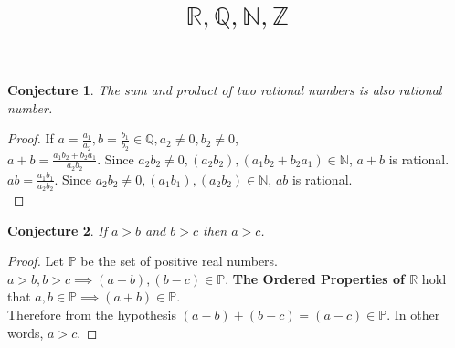 \documentclass{article}
\title{$\mathbb{R}, \mathbb{Q}, \mathbb{N}, \mathbb{Z}$}
\newtheorem*{conjecture}{Conjecture}
\newtheorem*{corollary}{Corollary}
\begin{document}
\maketitle

\begin{conjecture}The sum and product of two rational numbers
is also  rational number.
\end{conjecture}
\begin{proof}If $a=\frac{a_1}{a_2}, b=\frac{b_1}{b_2} \in \mathbb{Q},
    a_2 \ne{0}, b_2 \ne{0}$,\\
    
    $a+b=\frac{a_1b_2+b_2a_1}{a_2b_2}$. Since $a_2b_2 \ne{0}, (a_2b_2), (a_1b_2+b_2a_1) \in \mathbb{N}$,
    $a+b$ is rational.\\

    $ab=\frac{a_1b_1}{a_2b_2}$. Since $a_2b_2 \ne{0}, (a_1b_1), (a_2b_2) \in \mathbb{N}$,
    $ab$ is rational.\\
\end{proof}
\begin{conjecture}If $a>b$ and $b>c$ then $a>c$.
\end{conjecture}
\begin{proof}Let $\mathbb{P}$ be the set of positive real numbers.
    $a>b,b>c \implies (a-b),(b-c) \in \mathbb{P}$. 
    \textbf{The Ordered Properties of $\mathbb{R}$} hold that $a,b\in\mathbb{P}\implies(a+b)\in\mathbb{P}$.\\

    Therefore from the hypothesis $(a-b)+(b-c)=(a-c)\in\mathbb{P}$.
    In other words, $a>c$.
\end{proof}
    
% 
    
\end{document}
